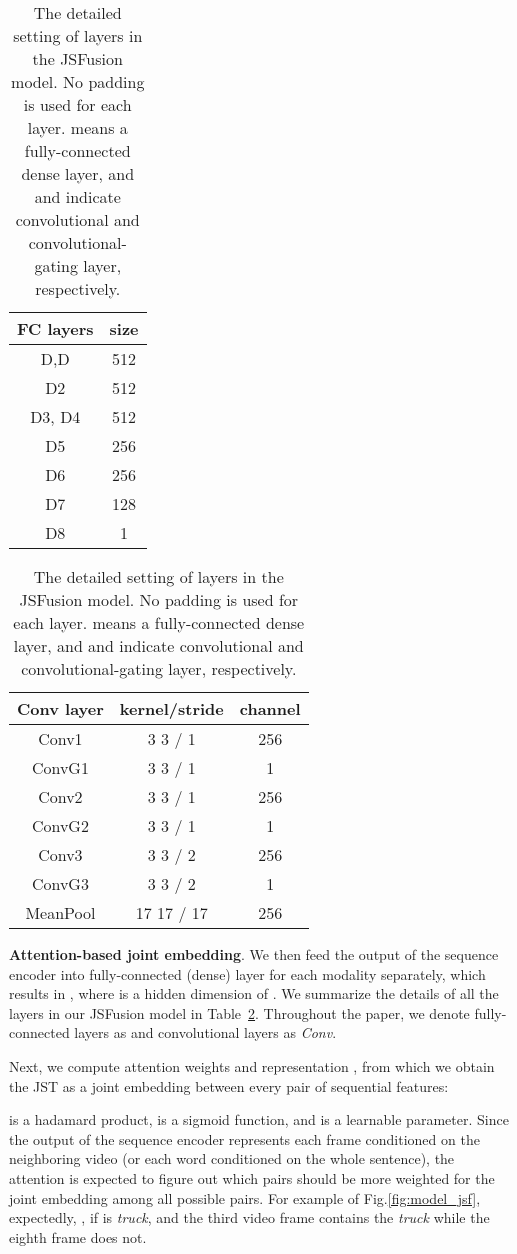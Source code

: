 \documentclass[runningheads]{llncs}
\begin{document}
\begin{table}[t]
\setlength\tabcolsep{8.5pt} \centering
\begin{tabular}{|c|c|}
	\hline
	FC layers   &  size  \\ \hline    D,D   & 512    \\ 
	D2   & 512    \\ 
	D3, D4   & 512   \\ \hline
	D5   & 256   \\ 
	D6   & 256   \\ 
	D7   & 128   \\ 
	D8   & 1     \\ \hline
\end{tabular}
\begin{tabular}{|c|c|c|}
    \hline
    Conv layer       &  kernel/stride   & channel \\ \hline
    Conv1     &  3  3 / 1& 256    \\ 
    ConvG1     &  3  3 / 1& 1    \\ \hline
    Conv2     &  3  3 / 1& 256    \\ 
    ConvG2     &  3  3 / 1& 1    \\ \hline
    Conv3     &  3  3 / 2& 256    \\ 
    ConvG3     &  3  3 / 2& 1    \\ \hline
    MeanPool        &  17  17 / 17 & 256    \\ \hline
  \end{tabular} 
\medskip

  \caption{
    The detailed setting of layers in the JSFusion model. No padding is used for each layer.  means a fully-connected dense layer, and  and  indicate convolutional and convolutional-gating layer, respectively. }
\label{tbl:layer_detail}
\end{table}


\textbf{Attention-based joint embedding}. 
We then feed the output of the sequence encoder into fully-connected (dense) layer  for each modality separately, which results in , where  is a hidden dimension of . 
We summarize the details of all the layers in our JSFusion model in Table~\ref{tbl:layer_detail}. 
Throughout the paper, we denote fully-connected layers as  and convolutional layers as \textit{Conv}.

Next, we compute attention weights  and representation , from which we obtain the  JST as a joint embedding between every pair of sequential features:

\noindent  is a hadamard product,  is a sigmoid function, and  is a learnable parameter. 
Since the output of the sequence encoder represents each frame conditioned on the neighboring video (or each word conditioned on the whole sentence), 
the attention  is expected to figure out which pairs should be more weighted for the joint embedding among all possible pairs.
For example of Fig.\ref{fig:model_jsf}, expectedly, , if  is \textit{truck}, 
and the third video frame contains the \textit{truck} while the eighth frame does not. 
\end{document}
